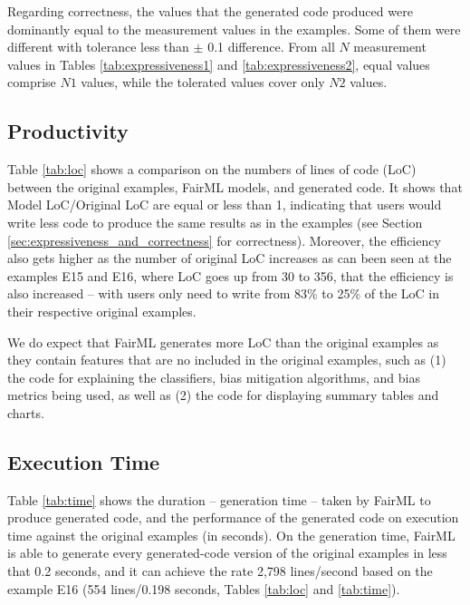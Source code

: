 \documentclass[sigconf,review]{acmart}
\begin{document}
Regarding correctness, the values that the generated code produced were dominantly equal to the measurement values in the examples. Some of them were different with tolerance less than $\pm$ 0.1 difference. From all $N$ measurement values in Tables \ref{tab:expressiveness1} and \ref{tab:expressiveness2}, equal values comprise $N1$ values, while the tolerated values cover only $N2$ values.  


\subsection{Productivity}
\label{sec:productivity}

Table \ref{tab:loc} shows a comparison on the numbers of lines of code (LoC) between the original examples, FairML models, and generated code. It shows that \textsf{Model LoC}/\textsf{Original LoC} are equal or less than 1, indicating that users would write less code to produce the same results as in the examples (see Section \ref{sec:expressiveness_and_correctness} for correctness). Moreover, the efficiency also gets higher as the number of original LoC increases as can been seen at the examples \textsf{E15} and \textsf{E16}, where LoC goes up from 30 to 356, that the efficiency is also increased -- with users only need to write from 83\% to 25\% of the LoC in their respective original examples.

We do expect that FairML generates more LoC than the original examples as they contain features that are no included in the original examples, such as (1) the code for explaining the classifiers, bias mitigation algorithms, and bias metrics being used, as well as (2) the code for displaying summary tables and charts. 




\subsection{Execution Time}
\label{sec:execution_time}

Table \ref{tab:time} shows the duration -- generation time -- taken by FairML to produce generated code, 
and the performance of the generated code on execution time against the original examples (in seconds). 
On the generation time, 
FairML is able to generate every generated-code version of the original examples in less that 0.2 seconds, 
and it can achieve the rate 2,798 lines/second based on the example E16 
(554 lines/0.198 seconds, Tables \ref{tab:loc} and \ref{tab:time}). 
\end{document}
